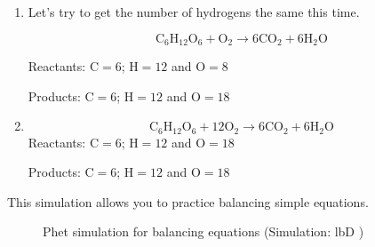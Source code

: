 {\begin{mdframed}[linewidth=4, leftmargin=40, rightmargin=40]
\begin{exercise}
\begin{enumerate}[noitemsep, label=\textbf{Step} \textbf{\arabic*}. ]
    \begin{equation}
    {\mathrm{C}}_{6}{\mathrm{H}}_{12}{\mathrm{O}}_{6}+{\mathrm{O}}_{2}\to 6{\mathrm{CO}}_{2}+\mathrm{H}{}_{2}\mathrm{O}\tag{13.16}
      \end{equation}
    \par 
        \label{m38726*id64998}Reactants: $\mathrm{C}=6$; $\mathrm{H}=12$ and $\mathrm{O}=8$\par 
        \label{m38726*id65004}Products: $\mathrm{C}=6$; $\mathrm{H}=2$ and $\mathrm{O}=13$\par 
        \item  
        \label{m38726*id65011}Let's try to get the number of hydrogens the same this time.
\label{m38726*uid0987213}\nopagebreak\noindent{}

    \begin{equation}
    {\mathrm{C}}_{6}{\mathrm{H}}_{12}{\mathrm{O}}_{6}+{\mathrm{O}}_{2}\to 6{\mathrm{CO}}_{2}+6\mathrm{H}{}_{2}\mathrm{O}\tag{13.17}
      \end{equation}
\par 
        \label{m38726*id65085}Reactants: $\mathrm{C}=6$; $\mathrm{H}=12$ and $\mathrm{O}=8$\par 
        \label{m38726*id65091}Products: $\mathrm{C}=6$; $\mathrm{H}=12$ and $\mathrm{O}=18$ \par 
        \item  
\label{m38726*uid091873}\nopagebreak\noindent{}

    \begin{equation}
    {\mathrm{C}}_{6}{\mathrm{H}}_{12}{\mathrm{O}}_{6}+12{\mathrm{O}}_{2}\to 6{\mathrm{CO}}_{2}+6\mathrm{H}{}_{2}\mathrm{O}\tag{13.18}
      \end{equation}
        \label{m38726*id65171}Reactants: $\mathrm{C}=6$; $\mathrm{H}=12$ and $\mathrm{O}=18$\par 
        \label{m38726*id65176}Products: $\mathrm{C}=6$; $\mathrm{H}=12$ and $\mathrm{O}=18$\par 
 \end{enumerate}
    \end{exercise}
    \end{mdframed}
    }
    \noindent
This simulation allows you to practice balancing simple equations.
   \setcounter{subfigure}{0}
	\begin{figure}[H] %
    \textnormal{Phet simulation for balancing equations}\vspace{.1in} \nopagebreak
  \label{m38806*phet!!!underscore!!!sim}\label{m38806*phet-simulation}
             { (Simulation:  lbD )}
      \vspace{2pt}
    \vspace{.1in}
 \end{figure}       
        \par \label{m38726*secfhsst!!!underscore!!!id763}
